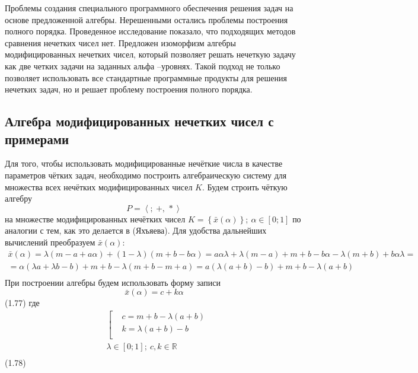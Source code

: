 Проблемы создания специального программного обеспечения решения задач на основе предложенной алгебры. Нерешенными остались проблемы построения полного порядка. Проведенное исследование показало, что подходящих методов сравнения нечетких чисел нет.
Предложен изоморфизм алгебры модифицированных нечетких чисел, который позволяет решать нечеткую задачу как две четких задачи на заданных альфа –уровнях.
Такой подход не только позволяет использовать все стандартные программные продукты для решения нечетких задач, но и решает проблему построения полного порядка.

\subsection{Алгебра модифицированных нечетких чисел с примерами}
Для того, чтобы использовать модифицированные нечёткие числа в качестве параметров чётких задач, необходимо построить алгебраическую систему для множества всех нечётких модифицированных чисел $K$. 
Будем строить чёткую алгебру \[P=\left\langle ;\ +,\,* \right\rangle \] на множестве модифицированных нечётких чисел $K=\left\{ \bar{x}\left( \alpha  \right) \right\};\ \alpha \in \left[ 0;1 \right]$ по аналогии с тем, как это делается в (Яхъяева). Для удобства дальнейших вычислений преобразуем $\bar{x}\left( \alpha  \right)$:
	\[\begin{matrix}
  \bar{x}\left( \alpha  \right)=\lambda \left( m-a+a\alpha  \right)+\left( 1-\lambda  \right)\left( m+b-b\alpha  \right)=a\alpha \lambda +\lambda \left( m-a \right)+m+b-b\alpha -\lambda \left( m+b \right)+b\alpha \lambda = \\ 
  =\alpha \left( \lambda a+\lambda b-b \right)+m+b-\lambda \left( m+b-m+a \right)=a\left( \lambda \left( a+b \right)-b \right)+m+b-\lambda \left( a+b \right) \\ 
\end{matrix}\] 
При построении алгебры будем использовать форму записи
	\[\bar{x}\left( \alpha  \right)=c+k\alpha \] 	(1.77)
где
	\[\begin{aligned}
  & \left[ \begin{aligned}
  & c=m+b-\lambda \left( a+b \right) \\ 
 & k=\lambda \left( a+b \right)-b \\ 
\end{aligned} \right. \\ 
 & \lambda \in \left[ 0;1 \right];\ c,k\in \mathbb{R} \\ 
\end{aligned}\] 	(1.78)
